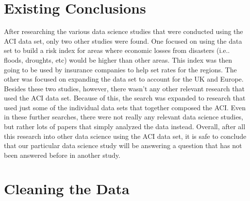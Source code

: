 \documentclass[12pt]{report}
\begin{document}
\section* {Existing Conclusions} 
		
\indent	\par After researching the various data science studies that were conducted using the ACI data set, only two other studies were found. One focused on using the data set to build a risk index for areas where economic losses from disasters (i.e.. floods, droughts, etc)  would be higher than other areas. This index was then going to be used by insurance companies to help set rates for the regions. The other was focused on expanding the data set to account for the UK and Europe. Besides these two studies, however, there wasn't any other relevant research that used the ACI data set. Because of this, the search was expanded to research that used just some of the individual data sets that together composed the ACI. Even in these further searches, there were not really any relevant data science studies, but rather lots of papers that simply analyzed the data instead. Overall, after all this research into other data science using the ACI data set, it is safe to conclude that our particular data science study will be answering a question that has not been answered before in another study.
		
\section* {Cleaning the Data} 
\end{document}
